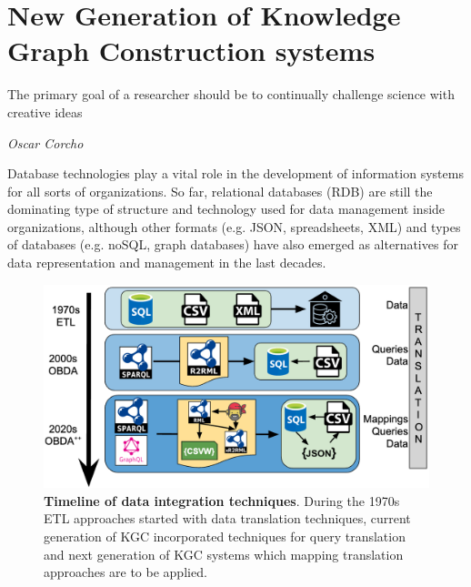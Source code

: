 
\chapter{New Generation of Knowledge Graph Construction systems}
\label{chapter:mappig-translation}

\epigraph{The primary goal of a researcher should be to continually challenge science with creative ideas}{\textit{Oscar Corcho}}


Database technologies play a vital role in the development of information systems for all sorts of organizations. So far, relational databases (RDB) are still the dominating type of structure and technology used for data management inside organizations, although other formats (e.g. JSON, spreadsheets, XML) and types of databases (e.g. noSQL, graph databases) have also emerged as alternatives for data representation and management in the last decades. 

\begin{figure}[!ht]
    \centering
    \includegraphics[width=1\columnwidth]{./figures/mt_obda_timeline.png}
    \caption[Timeline of data integration techniques]{\textbf{Timeline of data integration techniques}. During the 1970s ETL approaches started with data translation techniques, current generation of KGC incorporated techniques for query translation and next generation of KGC systems which mapping translation approaches are to be applied.
    }
    \label{fig:obdatimeline}
\end{figure}

